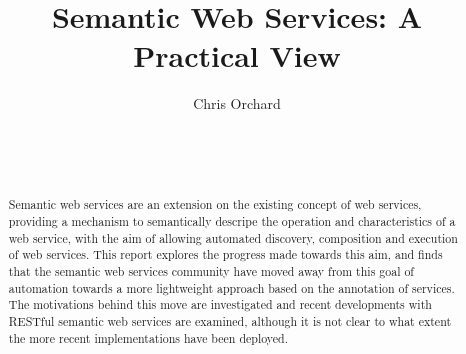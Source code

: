 \documentclass{acm_proc_article-sp}
\begin{document}
\title{Semantic Web Services: A Practical View}

\author{
\alignauthor
Chris Orchard\\
    \\
    \\
    \\
}

\maketitle
\begin{abstract}

Semantic web services are an extension on the existing concept of web services,
providing a mechanism to semantically descripe the operation and characteristics
of a web service, with the aim of allowing automated discovery, composition and
execution of web services. This report explores the progress made towards this
aim, and finds that the semantic web services community have moved away from
this goal of automation towards a more lightweight approach based on the
annotation of services. The motivations behind this move are investigated and
recent developments with RESTful semantic web services are examined, although it
is not clear to what extent the more recent implementations have been deployed.

\end{abstract}







\end{document}
